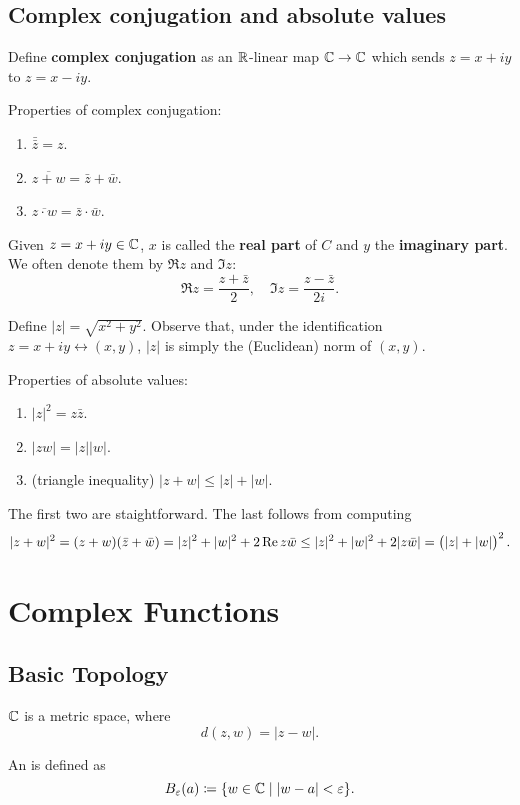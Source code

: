 \section{Complex conjugation and absolute values}
Define \textbf{complex conjugation} as an $\mathbb R$-linear map $\mathbb C\to\mathbb C$ which sends $z=x+iy$ to $z=x-iy$.

Properties of complex conjugation:
\begin{enumerate}[label=(\arabic*)]
\item $\bar{\bar{z}}=z$.
\item $\overline{z+w}=\bar{z}+\bar{w}$.
\item $\overline{z\cdot w}=\bar{z}\cdot\bar{w}$.
\end{enumerate}
Given $z=x+iy\in\mathbb C$, $x$ is called the \textbf{real part} of $C$ and $y$ the \textbf{imaginary part}. We often
denote them by $\Re z$ and $\Im z$:
\[\Re z=\frac{z+\bar{z}}{2},\quad\Im z=\frac{z-\bar{z}}{2i}.\]

Define $|z|=\sqrt{x^2+y^2}$. Observe that, under the identification $z=x+iy\leftrightarrow(x, y)$, $|z|$ is simply the (Euclidean) norm of $(x,y)$.

Properties of absolute values:
\begin{enumerate}[label=(\arabic*)]
\item $|z|^2=z\bar{z}$.
\item $|zw|=|z||w|$.
\item (triangle inequality) $|z+w|\le|z|+|w|$.
\end{enumerate}
The first two are staightforward. The last follows from computing
\[|z+w|^2=(z+w)(\bar{z}+\bar{w})=|z|^2+|w|^2+2\Re z\bar{w}\le|z|^2+|w|^2+2|z\bar{w}|=\left(|z|+|w|\right)^2.\]

\chapter{Complex Functions}
\section{Basic Topology}
$\mathbb C$ is a metric space, where
\[d(z,w)=|z-w|.\]

\begin{definition}
An  is defined as
\[B_\varepsilon(a)\coloneqq\{w\in\mathbb C\mid|w-a|<\varepsilon\}.\]
\end{definition}

